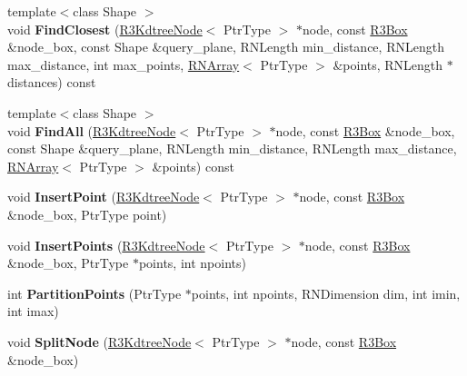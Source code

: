 \begin{DoxyCompactItemize}
\item 
{\footnotesize template$<$class Shape $>$ }\\void {\bfseries Find\+Closest} (\hyperlink{class_r3_kdtree_node}{R3\+Kdtree\+Node}$<$ Ptr\+Type $>$ $\ast$node, const \hyperlink{class_r3_box}{R3\+Box} \&node\+\_\+box, const Shape \&query\+\_\+plane, R\+N\+Length min\+\_\+distance, R\+N\+Length max\+\_\+distance, int max\+\_\+points, \hyperlink{class_r_n_array}{R\+N\+Array}$<$ Ptr\+Type $>$ \&points, R\+N\+Length $\ast$distances) const \hypertarget{class_r3_kdtree_a63dc40af47f90e875e42b71cd71a56d2}{}\label{class_r3_kdtree_a63dc40af47f90e875e42b71cd71a56d2}

\item 
{\footnotesize template$<$class Shape $>$ }\\void {\bfseries Find\+All} (\hyperlink{class_r3_kdtree_node}{R3\+Kdtree\+Node}$<$ Ptr\+Type $>$ $\ast$node, const \hyperlink{class_r3_box}{R3\+Box} \&node\+\_\+box, const Shape \&query\+\_\+plane, R\+N\+Length min\+\_\+distance, R\+N\+Length max\+\_\+distance, \hyperlink{class_r_n_array}{R\+N\+Array}$<$ Ptr\+Type $>$ \&points) const \hypertarget{class_r3_kdtree_a19116ff24636b65fe52f95eab958126e}{}\label{class_r3_kdtree_a19116ff24636b65fe52f95eab958126e}

\item 
void {\bfseries Insert\+Point} (\hyperlink{class_r3_kdtree_node}{R3\+Kdtree\+Node}$<$ Ptr\+Type $>$ $\ast$node, const \hyperlink{class_r3_box}{R3\+Box} \&node\+\_\+box, Ptr\+Type point)\hypertarget{class_r3_kdtree_a2ed8118bd91bde28954a6725dc305886}{}\label{class_r3_kdtree_a2ed8118bd91bde28954a6725dc305886}

\item 
void {\bfseries Insert\+Points} (\hyperlink{class_r3_kdtree_node}{R3\+Kdtree\+Node}$<$ Ptr\+Type $>$ $\ast$node, const \hyperlink{class_r3_box}{R3\+Box} \&node\+\_\+box, Ptr\+Type $\ast$points, int npoints)\hypertarget{class_r3_kdtree_a5c6cf3714975b2d0999ecf42788508c0}{}\label{class_r3_kdtree_a5c6cf3714975b2d0999ecf42788508c0}

\item 
int {\bfseries Partition\+Points} (Ptr\+Type $\ast$points, int npoints, R\+N\+Dimension dim, int imin, int imax)\hypertarget{class_r3_kdtree_a6962f9a9c107214e7b5646634e74e542}{}\label{class_r3_kdtree_a6962f9a9c107214e7b5646634e74e542}

\item 
void {\bfseries Split\+Node} (\hyperlink{class_r3_kdtree_node}{R3\+Kdtree\+Node}$<$ Ptr\+Type $>$ $\ast$node, const \hyperlink{class_r3_box}{R3\+Box} \&node\+\_\+box)\hypertarget{class_r3_kdtree_ab67ab9ab9d095ffb6151cc5e719cc356}{}\label{class_r3_kdtree_ab67ab9ab9d095ffb6151cc5e719cc356}


\end{DoxyCompactItemize}
